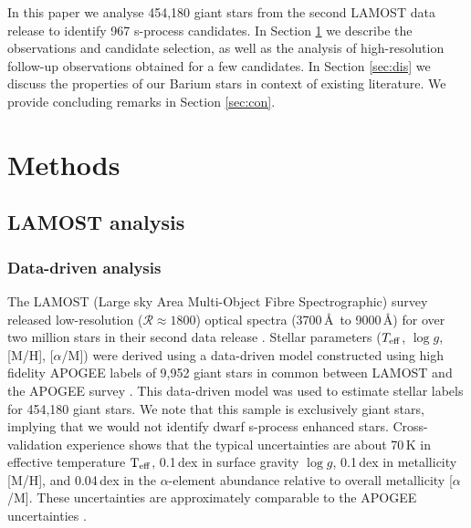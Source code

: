 \documentclass[a4paper,fleqn,usenatbib]{mnras}
\begin{document}
In this paper we analyse 454,180 giant stars from the second LAMOST data release \citep{luo2015} to identify 967 s-process candidates. In Section \ref{sec:methods} we describe the observations and candidate selection, as well as the analysis of high-resolution follow-up observations obtained for a few candidates. In Section \ref{sec:dis} we discuss the properties of our Barium stars in context of existing literature. We provide concluding remarks in Section \ref{sec:con}.

\section{Methods} \label{sec:methods}
\subsection{LAMOST analysis}
\subsubsection{Data-driven analysis}
The LAMOST (Large sky Area Multi-Object Fibre Spectrographic) survey released low-resolution ($\mathcal{R} \approx 1800$) optical spectra (3700\,\AA\ to 9000\,\AA) for over two million stars in their second data release \citep{luo2015}. Stellar parameters ($T_{\rm eff}$, $\log{g}$, [M/H], [$\alpha$/M]) were derived using a data-driven model constructed using high fidelity APOGEE labels of 9,952 giant stars in common between LAMOST and the APOGEE survey \citep{ho2017}. This data-driven model was used to estimate stellar labels for 454,180 giant stars. We note that this sample is exclusively giant stars, implying that we would not identify dwarf s-process enhanced stars. Cross-validation experience shows that the typical uncertainties are about 70\,K in effective temperature $\rm T_{\rm eff}$, 0.1\,dex in surface gravity $\log{g}$, 0.1\,dex in metallicity [M/H], and 0.04\,dex in the $\alpha$-element abundance relative to overall metallicity [$\alpha$/M]. These uncertainties are approximately comparable to the APOGEE uncertainties \citep{alam2015}.
\end{document}
